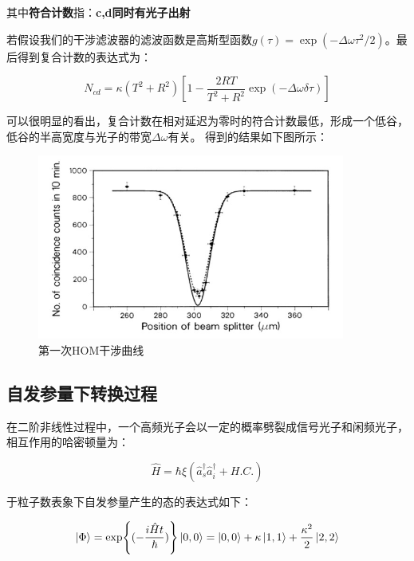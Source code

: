 \documentclass[a4paper,UTF8]{ctexart}
\begin{document}
其中{\bfseries{符合计数}}指：{\bfseries{c,d同时有光子出射}}

若假设我们的干涉滤波器的滤波函数是高斯型函数$g(\tau) = \exp{(-\Delta \omega \tau^2 /2)}$。最后得到复合计数的表达式为：

\begin{equation}
    N_{cd} = \kappa (T^2+R^2)[1-\frac{2RT}{T^2+R^2}\exp{(-\Delta \omega \delta \tau)}]
\end{equation}

可以很明显的看出，复合计数在相对延迟为零时的符合计数最低，形成一个低谷，低谷的半高宽度与光子的带宽$\Delta \omega$有关。
得到的结果如下图所示：

\begin{figure}[H]
    \centering
    \begin{minipage}[b]{0.9\textwidth}
        \centering
        \includegraphics[width=0.9\textwidth]{./fig3.jpg}
        \caption{第一次HOM干涉曲线}
    \end{minipage}
\end{figure}

\subsection{自发参量下转换过程}

在二阶非线性过程中，一个高频光子会以一定的概率劈裂成信号光子和闲频光子，相互作用的哈密顿量为：

\begin{equation}
    \hat{H} = \hbar \xi (\hat{a}_s^{\dagger}\hat{a}_i^{\dagger}+H.C.)
\end{equation}

于粒子数表象下自发参量产生的态的表达式如下：

\begin{equation}
    \ket{\Phi} = \exp{(-\frac{i\hat{H}t}{\hbar})}\ket{0,0} = \ket{0,0} + \kappa\ket{1,1} + \frac{\kappa^2}{2}\ket{2,2}
\end{equation}
\end{document}
